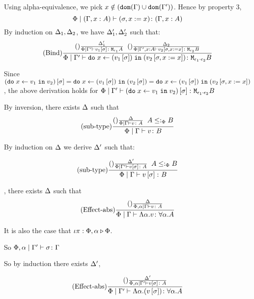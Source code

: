 {        Using alpha-equivalence, we pick $x\notin(\texttt{dom}(\Gamma)\cup\texttt{dom}(\Gamma'))$. Hence by property 3, $$\Phi\mid(\Gamma, x: A) \vdash (\sigma, x:= x) \colon (\Gamma, x: A)$$
        By induction on $\Delta_1, \Delta_2$, we have $\Delta_1', \Delta_2'$ such that:
        \begin{equation}
            (\text{Bind}) \frac{
                (\text{}) \frac{\Delta_1'}{\Phi\mid\Gamma' \vdash v_1\left[\sigma\right] \colon \texttt{M}_{\epsilon_1}{A}}
                \;\;
                (\text{}) \frac{\Delta_2}{\Phi\mid\Gamma', x:A \vdash v_2\left[\sigma, x:= x\right] \colon \texttt{M}_{\epsilon_2}{B}}
            }{\Phi\mid\Gamma' \vdash \texttt{do}\; x \leftarrow (v_1\left[\sigma\right]) \;\texttt{in}\; (v_2\left[\sigma, x:= x\right]) \colon \texttt{M}_{\epsilon_1\cdot\epsilon_2}{B}}
        \end{equation}

        Since $(\texttt{do}\; x \leftarrow v_1 \;\texttt{in}\; v_2)\left[\sigma\right] = \texttt{do}\; x \leftarrow (v_1\left[\sigma\right]) \;\texttt{in}\; (v_2\left[\sigma\right]) = \texttt{do}\; x \leftarrow (v_1\left[\sigma\right]) \;\texttt{in}\; (v_2\left[\sigma, x:= x\right])$, the above derivation holds for $\Phi\mid\Gamma' \vdash (\texttt{do}\; x \leftarrow v_1 \;\texttt{in}\; v_2)\left[\sigma\right] \colon \texttt{M}_{\epsilon_1\cdot\epsilon_2}{B}$
    
        By inversion, there exists $\Delta$ such that
        \begin{equation}
            (\text{sub-type}) \frac{(\text{}) \frac{\Delta}{\Phi\mid\Gamma \vdash v \colon A}\;\; A\leq:_\Phi B}{\Phi\mid\Gamma \vdash v \colon B}
        \end{equation}

        By induction on $\Delta$ we derive $\Delta'$ such that:

        \begin{equation}
            (\text{sub-type}) \frac{(\text{}) \frac{\Delta'}{\Phi\mid\Gamma' \vdash v\left[\sigma\right] \colon A}\;\; A\leq:_\Phi B}{\Phi\mid\Gamma \vdash v\left[\sigma\right] \colon B}
        \end{equation}

    \bi, there exists $\Delta$ such that 
    \begin{equation}
        (\text{Effect-abs}) \frac{(\text{}) \frac{\Delta}{\Phi,\alpha\mid\Gamma \vdash v \colon A}}{\Phi\mid\Gamma \vdash \Lambda \alpha. v \colon \forall \alpha. A}
    \end{equation}

    It is also the case that $\iota\pi : \Phi,\alpha \triangleright \Phi$.

    So $\Phi,\alpha\mid\Gamma' \vdash \sigma \colon \Gamma$

    So by induction there exists $\Delta'$,

    \begin{equation}
        (\text{Effect-abs}) \frac{(\text{}) \frac{\Delta'}{\Phi,\alpha\mid\Gamma' \vdash v\left[\sigma\right] \colon A}}{\Phi\mid\Gamma' \vdash \Lambda \alpha. (v\left[\sigma\right]) \colon \forall \alpha. A}
    \end{equation}

}
